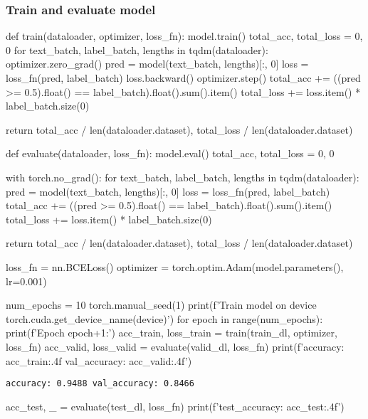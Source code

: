 \subsubsection{Train and evaluate model}

\begin{pythoncode}
def train(dataloader, optimizer, loss_fn):
    model.train()
    total_acc, total_loss = 0, 0
    for text_batch, label_batch, lengths in tqdm(dataloader):
        optimizer.zero_grad()
        pred = model(text_batch, lengths)[:, 0]
        loss = loss_fn(pred, label_batch)
        loss.backward()
        optimizer.step()
        total_acc += ((pred >= 0.5).float() == label_batch).float().sum().item()
        total_loss += loss.item() * label_batch.size(0)
    
    return total_acc / len(dataloader.dataset), total_loss / len(dataloader.dataset)

def evaluate(dataloader, loss_fn):
    model.eval()
    total_acc, total_loss = 0, 0

    with torch.no_grad():
        for text_batch, label_batch, lengths in tqdm(dataloader):
            pred = model(text_batch, lengths)[:, 0]
            loss = loss_fn(pred, label_batch)
            total_acc += ((pred >= 0.5).float() == label_batch).float().sum().item()
            total_loss += loss.item() * label_batch.size(0)

    return total_acc / len(dataloader.dataset), total_loss / len(dataloader.dataset)
\end{pythoncode}

\begin{pythoncode}
loss_fn = nn.BCELoss()
optimizer = torch.optim.Adam(model.parameters(), lr=0.001)

num_epochs = 10
torch.manual_seed(1)
print(f'Train model on device {torch.cuda.get_device_name(device)}')
for epoch in range(num_epochs):
    print(f'Epoch {epoch+1}:')
    acc_train, loss_train = train(train_dl, optimizer, loss_fn)
    acc_valid, loss_valid = evaluate(valid_dl, loss_fn)
    print(f'accuracy: {acc_train:.4f} val_accuracy: {acc_valid:.4f}')
\end{pythoncode}

\begin{verbatim}
accuracy: 0.9488 val_accuracy: 0.8466
\end{verbatim}

\begin{pythoncode}
acc_test, _ = evaluate(test_dl, loss_fn)
print(f'test_accuracy: {acc_test:.4f}')
\end{pythoncode}


